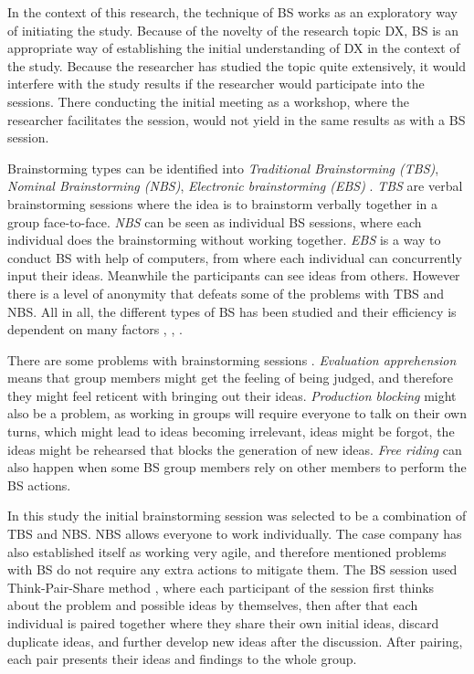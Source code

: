 \documentclass[english, 12pt, a4paper, sci, utf8, a-1b, online]{aaltothesis}
\begin{document}
In the context of this research, the technique of BS works as an exploratory way of initiating the study. Because of the novelty of the research topic DX, BS is an appropriate way of establishing the initial understanding of DX in the context of the study. Because the researcher has studied the topic quite extensively, it would interfere with the study results if the researcher would participate into the sessions. There conducting the initial meeting as a workshop, where the researcher facilitates the session, would not yield in the same results as with a BS session.

Brainstorming types can be identified into \textit{Traditional Brainstorming (TBS)}, \textit{Nominal Brainstorming (NBS)}, \textit{Electronic brainstorming (EBS)} \citep{brainstorming-techniques}. \textit{TBS} are verbal brainstorming sessions where the idea is to brainstorm verbally together in a group face-to-face. \textit{NBS} can be seen as individual BS sessions, where each individual does the brainstorming without working together. \textit{EBS} is a way to conduct BS with help of computers, from where each individual can concurrently input their ideas. Meanwhile the participants can see ideas from others. However there is a level of anonymity that defeats some of the problems with TBS and NBS.  All in all, the different types of BS has been studied and their efficiency is dependent on many factors \citep{productivity-loss-in-brainstorming-groups}, \citep{electronic-brainstorming}, \citep{chainstorm}.

There are some problems with brainstorming sessions \citep{electronic-brainstorming} \citep{chainstorm}. \textit{Evaluation apprehension} means that group members might get the feeling of being judged, and therefore they might feel reticent with bringing out their ideas. \textit{Production blocking} might also be a problem, as working in groups will require everyone to talk on their own turns, which might lead to ideas becoming irrelevant, ideas might be forgot, the ideas might be rehearsed that blocks the generation of new ideas. \textit{Free riding} can also happen when some BS group members rely on other members to perform the BS actions.

In this study the initial brainstorming session was selected to be a combination of TBS and NBS. NBS allows everyone to work individually. The case company has also established itself as working very agile, and therefore mentioned problems with BS do not require any extra actions to mitigate them. The BS session used Think-Pair-Share method \citep{think-pair-share}, where each participant of the session first thinks about the problem and possible ideas by themselves, then after that each individual is paired together where they share their own initial ideas, discard duplicate ideas, and further develop new ideas after the discussion. After pairing, each pair presents their ideas and findings to the whole group. 
\end{document}

